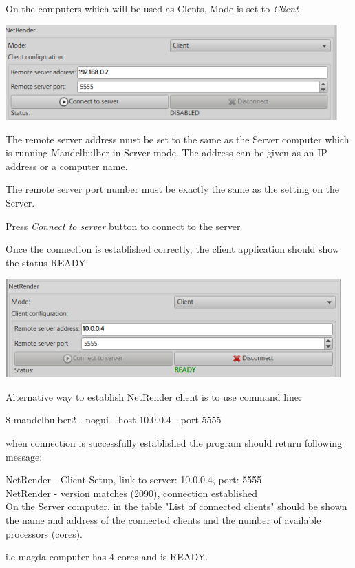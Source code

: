 On the computers which will be used as Clents, Mode is set to
\emph{Client}

\includegraphics[width=5.02441in,height=1.43071in]{img/manual/media/image29.png}

The remote server address must be set to the same as the Server computer
which is running Mandelbulber in Server mode. The address can be given
as an IP address or a computer name.

The remote server port number must be exactly the same as the setting on
the Server.

Press \emph{Connect to server} button to connect to the server

Once the connection is established correctly, the client application
should show the status READY

\includegraphics[width=5.07283in,height=1.48976in]{img/manual/media/image30.png}

Alternative way to establish NetRender client is to use command line:

\$ mandelbulber2 -\/-nogui -\/-host 10.0.0.4 -\/-port 5555

when connection is successfully established the program should return
following message:

NetRender - Client Setup, link to server: 10.0.0.4, port: 5555\\
NetRender - version matches (2090), connection
established\\[2\baselineskip]On the Server computer, in the table "List
of connected clients" should be shown the name and address of the
connected clients and the number of available processors (cores).

i.e magda computer has 4 cores and is READY.

